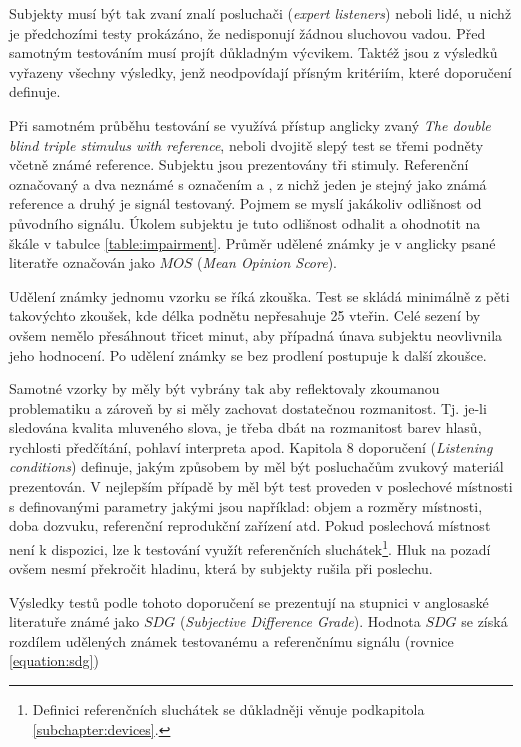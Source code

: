 Subjekty musí být tak zvaní znalí posluchači (\textit{expert listeners}) neboli lidé, u nichž je předchozími testy prokázáno, že nedisponují žádnou sluchovou vadou. Před samotným testováním musí projít důkladným výcvikem. Taktéž jsou z výsledků vyřazeny všechny výsledky, jenž neodpovídají přísným kritériím, které doporučení definuje.

Při samotném průběhu testování se využívá přístup anglicky zvaný \textit{The double blind triple stimulus with reference}, neboli dvojitě slepý test se třemi podněty včetně známé reference. Subjektu jsou prezentovány tři stimuly. Referenční označovaný  a dva neznámé s označením  a , z nichž jeden je stejný jako známá reference a druhý je signál testovaný. Pojmem  se myslí jakákoliv odlišnost od původního signálu. Úkolem subjektu je tuto odlišnost odhalit a ohodnotit na škále v tabulce \ref{table:impairment}. Průměr udělené známky je v anglicky psané literatře označován jako $MOS$ (\textit{Mean Opinion Score}).

Udělení známky jednomu vzorku se říká zkouška. Test se skládá minimálně z pěti takovýchto zkoušek, kde délka podnětu nepřesahuje 25 vteřin. Celé sezení by ovšem nemělo přesáhnout třicet minut, aby případná únava subjektu neovlivnila jeho hodnocení. Po udělení známky se bez prodlení postupuje k další zkoušce.

Samotné vzorky by měly být vybrány tak aby reflektovaly zkoumanou problematiku a zároveň by si měly zachovat dostatečnou rozmanitost. Tj. je-li sledována kvalita mluveného slova, je třeba dbát na rozmanitost barev hlasů, rychlosti předčítání, pohlaví interpreta apod. Kapitola 8 doporučení \cite{itur:1116}  (\textit{Listening conditions}) definuje, jakým způsobem by měl být posluchačům zvukový materiál prezentován. V nejlepším případě by měl být test proveden v poslechové místnosti s definovanými parametry jakými jsou například: objem a rozměry místnosti, doba dozvuku, referenční reprodukční zařízení atd. Pokud poslechová místnost není k dispozici, lze k testování využít referenčních sluchátek\footnote{Definici referenčních sluchátek se důkladněji věnuje podkapitola \ref{subchapter:devices}.}. Hluk na pozadí ovšem nesmí překročit hladinu, která by subjekty rušila při poslechu.

Výsledky testů podle tohoto doporučení se prezentují na stupnici v anglosaské literatuře známé jako $SDG$ (\textit{Subjective Difference Grade}). Hodnota $SDG$ se získá rozdílem udělených známek testovanému a referenčnímu signálu (rovnice \ref{equation:sdg})

